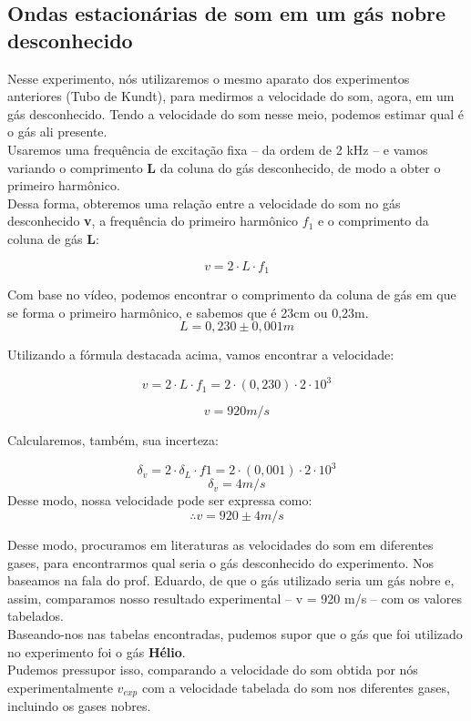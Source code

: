 \subsection{Ondas estacionárias de som em um gás nobre
desconhecido}

Nesse experimento, nós utilizaremos o mesmo aparato dos experimentos anteriores (Tubo de Kundt), para medirmos a velocidade do som, agora, em um gás desconhecido. Tendo a velocidade do som nesse meio, podemos estimar qual é o gás ali presente.\\

Usaremos uma frequência de excitação fixa – da ordem de 2 kHz – e vamos variando o comprimento \textbf{L} da coluna do gás desconhecido, de modo a obter o primeiro harmônico.\\

Dessa forma, obteremos uma relação entre a velocidade do som no gás desconhecido \textbf{v}, a frequência do primeiro harmônico \textbf{$f_1$} e o comprimento da coluna de gás \textbf{L}:

\[v = 2\cdot L\cdot f_1\]

Com base no vídeo, podemos encontrar o comprimento da coluna de gás em que se forma o primeiro harmônico, e sabemos que é 23cm ou 0,23m. 
\[L = 0,230 \pm 0,001 m\]

Utilizando a fórmula destacada acima, vamos encontrar a velocidade:

\[ v = 2\cdot L \cdot f_1   =   2\cdot(0,230)\cdot 2\cdot 10^3\]

\[v = 920 m/s\]

Calcularemos, também, sua incerteza:

\[\delta _v = 2 \cdot \delta _L \cdot f1   =   2\cdot(0,001)\cdot2\cdot10^3\]
\[\delta _v = 4 m/s\]
Desse modo, nossa velocidade pode ser expressa como:
\[\therefore v = 920 \pm 4 m/s\]

Desse modo, procuramos em literaturas as velocidades do som em diferentes gases, para encontrarmos qual seria o gás desconhecido do experimento. Nos baseamos na fala do prof. Eduardo, de que o gás utilizado seria um gás nobre e, assim, comparamos nosso resultado experimental -- v = 920 m/s -- com os valores tabelados.\\



Baseando-nos nas tabelas encontradas, pudemos supor que o gás que foi utilizado no experimento foi o gás \textbf{Hélio}.\\

Pudemos pressupor isso, comparando a velocidade do som obtida por nós experimentalmente $v_{exp}$ com a velocidade tabelada do som nos diferentes gases, incluindo os gases nobres.


